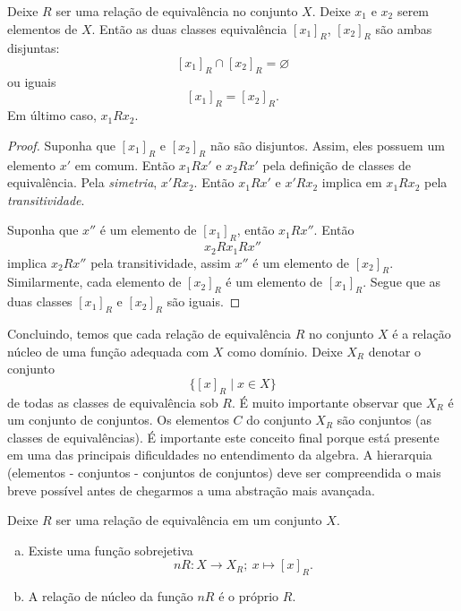 \begin{stat}\label{PropLag1}
  Deixe $R$ ser uma relação de equivalência no conjunto $X$. Deixe $x_{1}$ e $x_{2}$ serem elementos de $X$. Então as duas classes equivalência $\left[x_{1}\right]_{R}$, $\left[x_{2}\right]_{R}$ são ambas disjuntas: $$\left[x_{1}\right]_{R} \cap \left[x_{2}\right]_{R} = \varnothing$$ ou iguais $$\left[x_{1}\right]_{R} = \left[x_{2}\right]_{R}.$$ Em último caso, $x_{1} R x_{2}$.
  \begin{proof}
    Suponha que $\left[x_{1}\right]_{R}$ e $\left[x_{2}\right]_{R}$ não são disjuntos. Assim, eles possuem um elemento $x'$ em comum. Então $x_{1} R x'$ e $x_{2} R x'$ pela definição de classes de equivalência. Pela \emph{simetria}, $x' R x_{2}$. Então $x_{1} R x'$ e $x' R x_{2}$ implica em $x_{1} R x_{2}$ pela \emph{transitividade}.

    Suponha que $x''$ é um elemento de $\left[x_{1}\right]_{R}$, então $x_{1} R x''$. Então $$ x_{2} R x_{1} R x''$$ implica $x_{2} R x''$ pela transitividade, assim $x''$ é um elemento de $\left[x_{2}\right]_{R}$. Similarmente, cada elemento de $\left[x_{2}\right]_{R}$ é um elemento de $\left[x_{1}\right]_{R}$. Segue que as duas classes $\left[x_{1}\right]_{R}$ e $\left[x_{2}\right]_{R}$ são iguais.
  \end{proof}
\end{stat}
Concluindo, temos que cada relação de equivalência $R$ no conjunto $X$ é a relação núcleo de uma função adequada com $X$ como domínio. Deixe $X_{R}$ denotar o conjunto $$\{\left[x\right]_{R} \mid x \in X\}$$ de todas as classes de equivalência sob $R$. É muito importante observar que $X_{R}$ é um conjunto de conjuntos. Os elementos $C$ do conjunto $X_{R}$ são conjuntos (as classes de equivalências). É importante este conceito final porque está presente em uma das principais dificuldades no entendimento da algebra. A hierarquia (elementos - conjuntos - conjuntos de conjuntos) deve ser compreendida o mais breve possível antes de chegarmos a uma abstração mais avançada.

\begin{stat}
  Deixe $R$ ser uma relação de equivalência em um conjunto $X$.
  \begin{enumerate}[(a)]
    \item Existe uma função sobrejetiva $$nR: X\to X_{R};\ x\mapsto \left[x\right]_{R}.$$
    \item A relação de núcleo da função $nR$ é o próprio $R$.
  \end{enumerate}
\end{stat}
\newpage

